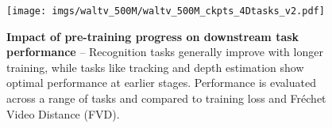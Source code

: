 \begin{figure}[t]



\texttt{[image: imgs/waltv\_500M/waltv\_500M\_ckpts\_4Dtasks\_v2.pdf]}
\vspace{-2mm}
\setlength{\belowcaptionskip}{-10pt}
\caption{
\textbf{Impact of pre-training progress on downstream task performance} -- Recognition tasks generally improve with longer training, while tasks like tracking and depth estimation show optimal performance at earlier stages.  Performance is evaluated across a range of tasks and compared to training loss and Fréchet Video Distance (FVD).
}
\label{fig:training_progress}
\end{figure}

